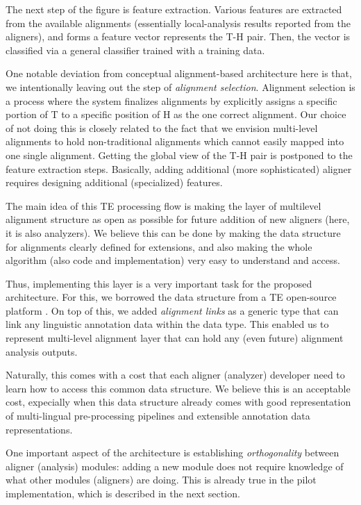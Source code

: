 \documentclass[11pt,letterpaper]{article}
\begin{document}
The next step of the figure is feature extraction. Various features
are extracted from the available alignments (essentially
local-analysis results reported from the aligners), and forms a
feature vector represents the T-H pair. Then, the vector is classified
via a general classifier trained with a training data.   

One notable deviation from conceptual alignment-based architecture
here is that, we intentionally leaving out the step of {\em alignment 
selection}. Alignment selection is a process where the system
finalizes alignments by explicitly assigns a specific portion of T to  
a specific position of H as the one correct alignment. Our choice of
not doing this is closely related to the fact that we envision
multi-level alignments to hold non-traditional alignments which cannot
easily mapped into one single alignment. Getting the global view of
the T-H pair is postponed to the feature extraction steps. Basically,
adding additional (more sophisticated) aligner requires designing
additional (specialized) features.   

The main idea of this TE processing flow is making the layer of
multilevel alignment structure as open as possible for future 
addition of new aligners (here, it is also analyzers). We believe this
can be done by making the data structure for alignments clearly
defined for extensions, and also making the whole algorithm (also code
and implementation) very easy to understand and access.  

Thus, implementing this layer is a very important task for the
proposed architecture. For this, we borrowed the data structure from
a TE open-source platform \cite{}. On top of this, we  added {\em
alignment links} as a generic type that can link any linguistic
annotation data within the data type. This enabled us to represent
multi-level alignment layer that can hold any (even future) alignment
analysis outputs.

Naturally, this comes with a cost that each aligner (analyzer)
developer need to learn how to access this common data structure.
We believe this is an acceptable cost, expecially when this data
structure already comes with good representation of multi-lingual
pre-processing pipelines and extensible annotation data
representations. 

One important aspect of the architecture is establishing {\em
orthogonality} \cite{} between aligner (analysis) modules: adding a
new module does not require knowledge of what other modules (aligners)
are doing. This is already true in the pilot implementation, which is
described in the next section. 
\end{document}
